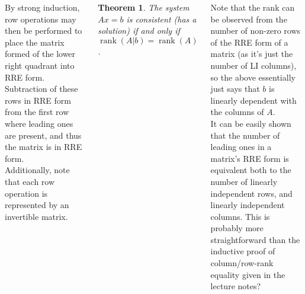 \documentclass{tikzposter} %
\DeclareMathOperator{\rank}{rank}
\newtheorem{theorem}{Theorem}
\newtheorem{lemma}[theorem]{Lemma}
\begin{document}
\begin{columns}
{{    By strong induction, row operations may then be performed to place the matrix formed of the lower right quadrant into RRE form. Subtraction of these rows in RRE form from the first row where leading ones are present, and thus the matrix is in RRE form. \\

    Additionally, note that each row operation is represented by an invertible matrix. \\

    \begin{theorem}
      The system $Ax = b$ is consistent (has a solution) if and only if $\rank (A|b) = \rank(A)$. \\
    \end{theorem}

    Note that the rank can be observed from the number of non-zero rows of the RRE form of a matrix (as it's just the number of LI columns), so the above essentially just says that $b$ is linearly dependent with the columns of $A$. \\

    It can be easily shown that the number of leading ones in a matrix's RRE form is equivalent both to the number of linearly independent rows, and linearly independent columns. This is probably more straightforward than the inductive proof of column/row-rank equality given in the lecture notes?
  }
  \hphantom{}
  }
\end{columns}
\end{document}
